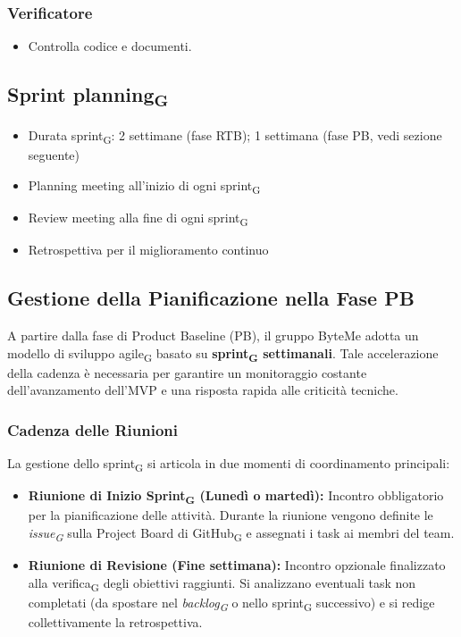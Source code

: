\documentclass[11pt,a4paper]{article}
\newcommand{\gls}[1]{#1\textsubscript{G}}
\begin{document}
\subsubsection{Verificatore}
\begin{itemize}
    \item Controlla codice e documenti.
\end{itemize}

\subsection{\gls{Sprint planning}}
\begin{itemize}
    \item Durata \gls{sprint}: 2 settimane (fase RTB); 1 settimana (fase PB, vedi sezione seguente)
    \item Planning meeting all'inizio di ogni \gls{sprint}
    \item Review meeting alla fine di ogni \gls{sprint}
    \item Retrospettiva per il miglioramento continuo
\end{itemize}

\subsection{Gestione della Pianificazione nella Fase PB}
A partire dalla fase di Product Baseline (PB), il gruppo ByteMe adotta un modello di sviluppo \gls{agile} basato su \textbf{\gls{sprint} settimanali}. Tale accelerazione della cadenza è necessaria per garantire un monitoraggio costante dell'avanzamento dell'MVP e una risposta rapida alle criticità tecniche.

\subsubsection{Cadenza delle Riunioni}
La gestione dello \gls{sprint} si articola in due momenti di coordinamento principali:
\begin{itemize}
    \item \textbf{Riunione di Inizio \gls{Sprint} (Lunedì o martedì):} Incontro obbligatorio per la pianificazione delle attività. Durante la riunione vengono definite le \textit{\gls{issue}} sulla Project Board di \gls{GitHub} e assegnati i task ai membri del team.
    \item \textbf{Riunione di Revisione (Fine settimana):} Incontro opzionale finalizzato alla \gls{verifica} degli obiettivi raggiunti. Si analizzano eventuali task non completati (da spostare nel \textit{\gls{backlog}} o nello \gls{sprint} successivo) e si redige collettivamente la retrospettiva.
\end{itemize}
\end{document}

